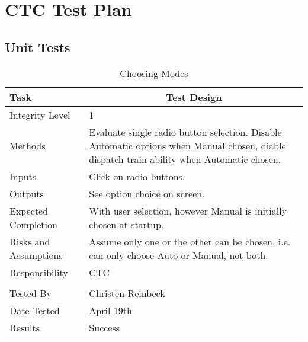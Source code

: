 \documentclass[]{article}
\begin{document}
\section{CTC Test Plan}
\subsection{Unit Tests}
\begin{table}[H]
	\centering
	\caption{Choosing Modes}
	\begin{tabular}{|l|l|}
		\hline
		Task & \multicolumn{1}{c|}{Test Design} \\ \hline
		Integrity Level & 1 \\ \hline
		Methods & \parbox[t]{10cm}{Evaluate single radio button selection. Disable Automatic options when Manual chosen, diable dispatch train ability when Automatic chosen.}\\ \hline
		Inputs &  Click on radio buttons. \\ \hline
		Outputs &  See option choice on screen.\\ \hline
		Expected Completion & \parbox[t]{10cm}{With user selection, however Manual is initially chosen at startup.}\\ \hline
		Risks and Assumptions & \parbox[t]{10cm}{Assume only one or the other can be chosen. i.e. can only choose Auto or Manual, not both.} \\ \hline
		Responsibility & CTC\\ \hline
		\\ \hline
		Tested By   &  Christen Reinbeck\\	\hline
		Date Tested & \parbox[t]{10cm}{April 19th}\\ \hline
		Results &Success\\ \hline
	\end{tabular}
\end{table}
\end{document}
